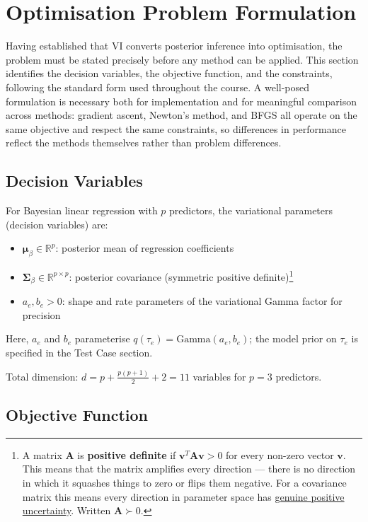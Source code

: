 \documentclass[11pt,a4paper]{article}
\newcommand{\R}{\mathbb{R}}
\begin{document}
\section*{Optimisation Problem Formulation}

Having established that VI converts posterior inference into optimisation, the problem must be stated precisely before any method can be applied. This section identifies the decision variables, the objective function, and the constraints, following the standard form used throughout the course. A well-posed formulation is necessary both for implementation and for meaningful comparison across methods: gradient ascent, Newton's method, and BFGS all operate on the same objective and respect the same constraints, so differences in performance reflect the methods themselves rather than problem differences.

\subsection*{Decision Variables}

For Bayesian linear regression with $p$ predictors, the variational parameters (decision variables) are:
\begin{itemize}
\item $\bm{\mu}_\beta \in \R^p$: posterior mean of regression coefficients
\item $\bm{\Sigma}_\beta \in \R^{p \times p}$: posterior covariance 
(symmetric positive definite)\footnote{A matrix $\bm{A}$ is \textbf{positive definite} 
if $\bm{v}^T\bm{A}\bm{v} > 0$ for every non-zero vector $\bm{v}$. This means that the matrix amplifies every 
direction --- there is no direction in which it squashes things to zero or flips them negative. For a
 covariance matrix this means every direction in parameter space has \underline{genuine positive uncertainty}. 
 Written $\bm{A} \succ 0$.}
\item $a_e, b_e > 0$: shape and rate parameters of the variational Gamma factor for precision
\end{itemize}

Here, $a_e$ and $b_e$ parameterise $q(\tau_e)=\mathrm{Gamma}(a_e,b_e)$; 
the model prior on $\tau_e$ is specified in the Test Case section.  \vspace{1em} 

Total dimension: $d = p + \frac{p(p+1)}{2} + 2 = 11$ variables for $p=3$ predictors.

\subsection*{Objective Function}
\end{document}
